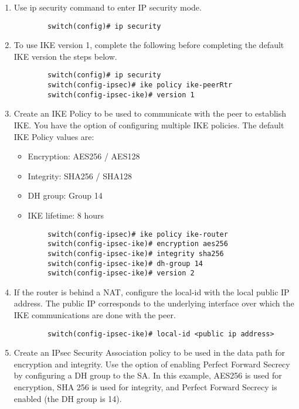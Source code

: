 \begin{enumerate}
\item Use ip security command to enter IP security mode. 
    \begin{lstlisting}
        switch(config)# ip security
    \end{lstlisting}
\item To use IKE version 1, complete the following before completing the default IKE version the steps below.
        \begin{lstlisting}
        switch(config)# ip security
        switch(config-ipsec)# ike policy ike-peerRtr  
        switch(config-ipsec-ike)# version 1
        \end{lstlisting}
\item Create an IKE Policy to be used to communicate with the peer to establish IKE. You have the option of configuring multiple IKE policies.
    The default IKE Policy values are:
        \begin{itemize}
            \item Encryption: AES256 / AES128
            \item Integrity: SHA256 / SHA128
            \item DH group: Group 14
            \item IKE lifetime: 8 hours
        \end{itemize}
        \begin{lstlisting}
        switch(config-ipsec)# ike policy ike-router  
        switch(config-ipsec-ike)# encryption aes256  
        switch(config-ipsec-ike)# integrity sha256  
        switch(config-ipsec-ike)# dh-group 14  
        switch(config-ipsec-ike)# version 2
        \end{lstlisting}
\item If the router is behind a NAT, configure the local-id with the local public IP address. The public IP corresponds to the underlying interface over which the IKE communications are done with the peer.
        \begin{lstlisting}
        switch(config-ipsec-ike)# local-id <public ip address>
        \end{lstlisting}
\item Create an IPsec Security Association policy to be used in the data path for encryption and integrity. Use the option of enabling Perfect Forward Secrecy by configuring a DH group to the SA. In this example, AES256 is used for encryption, SHA 256 is used for integrity, and Perfect Forward Secrecy is enabled (the DH group is 14).

\end{enumerate}
